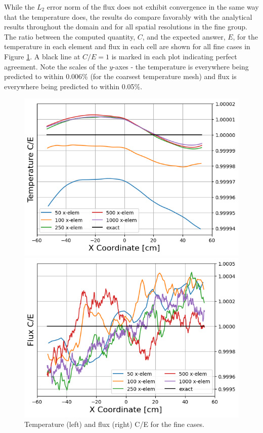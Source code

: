 \documentclass[letterpaper]{mc2023}
\begin{document}
While the $L_2$ error norm of the flux does not exhibit convergence in the same way that the temperature does, the results do compare favorably
with the analytical results throughout the domain and for all spatial resolutions in the fine group. The ratio between the computed quantity,
$C$, and the expected answer, $E$, for the temperature in each element and flux in each cell are shown for all fine cases in Figure \ref{fig:fine_ce}.
A black line at $C/E = 1$ is marked in each plot indicating perfect agreement. Note the scales of the $y$-axes - the temperature is everywhere
being predicted to within 0.006\% (for the coarsest temperature mesh) and flux is everywhere being predicted to within 0.05\%.
\begin{figure}[H]
    \centering
    \begin{minipage}[b]{0.49\linewidth}
        \includegraphics[width=\linewidth]{figures/fine_temp_num_to_analy_ratios.png}
    \end{minipage}
    \begin{minipage}[b]{0.49\linewidth}
        \includegraphics[width=\linewidth]{figures/fine_flux_num_to_analy_ratios.png}
    \end{minipage}
    \caption{Temperature (left) and flux (right) C/E for the fine cases.}
    \label{fig:fine_ce}
\end{figure}
\end{document}
